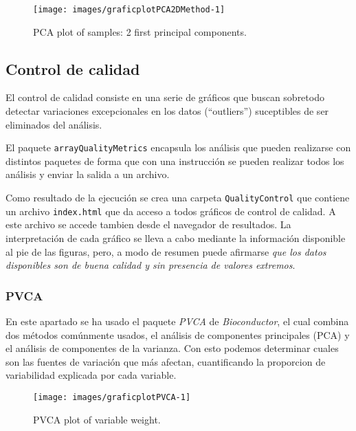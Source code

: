 \documentclass[a4paper]{article}\usepackage[]{graphicx}\usepackage[]{color}
\makeatletter
\def\maxwidth{ %
  \ifdim\Gin@nat@width>\linewidth
    \linewidth
  \else
    \Gin@nat@width
  \fi
}
\newenvironment{knitrout}{}{} %
\newcommand{\Rpackage}[1]{{\texttt{#1}}}
\makeatother
\begin{document}
\begin{knitrout}
\color{fgcolor}\begin{figure}
\texttt{[image: images/graficplotPCA2DMethod-1]} \caption[PCA plot of samples]{PCA plot of samples: 2 first principal components.}\label{fig:plotPCA2DMethod}
\end{figure}


\end{knitrout}





\subsection{Control de calidad}

El control de calidad consiste en una serie de gráficos que buscan sobretodo detectar variaciones excepcionales en los datos (``outliers'') suceptibles de ser eliminados del análisis.

El paquete \Rpackage{arrayQualityMetrics} encapsula los análisis que
pueden realizarse con distintos paquetes de forma que con una
instrucción se pueden realizar todos los análisis y enviar la salida a
un archivo.






Como resultado de la ejecución se crea una carpeta \texttt{QualityControl} que contiene un archivo \texttt{index.html} que da acceso a todos gráficos de control de calidad. A este archivo se accede tambien desde el navegador de resultados. La interpretación de cada gráfico se lleva a cabo mediante la información disponible al pie de las figuras, pero, a modo de resumen puede afirmarse \emph{que los datos disponibles son de buena calidad y sin presencia de valores extremos}.

\subsubsection{PVCA}
En este apartado se ha usado el paquete \textit{PVCA} de \textit{Bioconductor}, el cual combina dos m\'etodos com\'unmente usados, el an\'alisis de componentes principales (PCA) y el an\'alisis de componentes de la varianza. Con esto podemos determinar cuales son las fuentes de variaci\'on que m\'as afectan, cuantificando la proporcion de variabilidad explicada por cada variable.

\begin{knitrout}
\color{fgcolor}\begin{figure}
\texttt{[image: images/graficplotPVCA-1]} \caption[PVCA plot of variable weight]{PVCA plot of variable weight.}\label{fig:plotPVCA}
\end{figure}


\end{knitrout}
\end{document}
